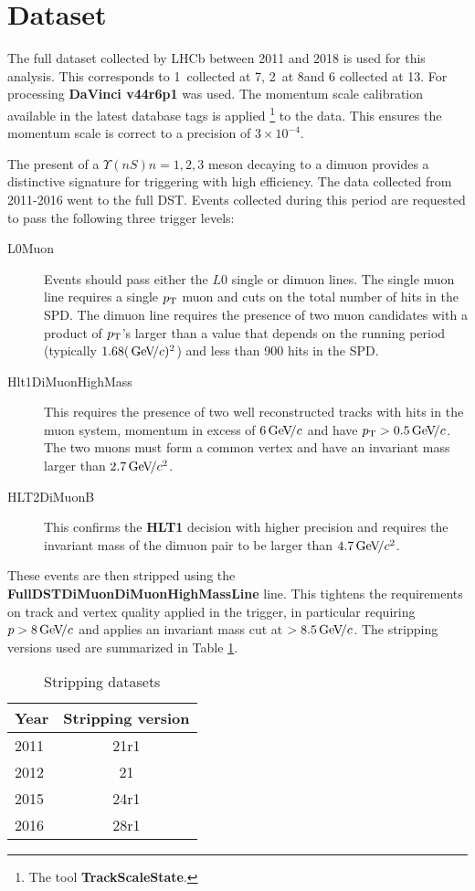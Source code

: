 \section{Dataset}
\label{sec:dataset}
%
The full dataset collected by LHCb between 2011 and 2018 is used for
this analysis. This corresponds to 1~\invfb collected at 7\tev,
2~\invfb at 8\tev and 6 \invfb collected at 13\tev. For processing
\textbf{DaVinci v44r6p1} was used. The momentum scale calibration available in the latest database
tags is applied \footnote{The tool \textbf{TrackScaleState}.} to the data. This
ensures the momentum scale is correct to a precision of $3
\times 10^{-4}$.

The present of a $\Upsilon(nS) n = 1,2,3$ meson decaying to a dimuon
provides a distinctive signature for triggering with high efficiency. The data collected
from 2011-2016 went to the full DST. Events collected during this
period are requested to pass the following three trigger levels:
\begin{description}
\item[L0Muon] Events should pass either the $L0$ single or dimuon
  lines. The single muon line requires a single $p_{\mathrm{T}}$ muon and cuts on
  the total number of hits in the SPD. The dimuon line requires the presence of two muon candidates
  with a product of $p_{\mathrm{T}}$'s larger than a value that depends on the
  running period (typically $1.68 (\text{\,Ge\kern -0.1em V\!/}c)^2$) and less than 900 hits
  in the SPD.
\item[Hlt1DiMuonHighMass] This requires the presence of two well
  reconstructed tracks with hits in the muon system, momentum in
  excess of $6 \text{\,Ge\kern -0.1em V\!/}c$ and have $p_{\mathrm{T}} > 0.5 \text{\,Ge\kern -0.1em V\!/}c$. The two muons must
  form a common vertex and have an invariant mass larger than $2.7
  \text{\,Ge\kern -0.1em V\!/}c^2$. 
\item[HLT2DiMuonB] This confirms the \textbf{HLT1} decision with higher precision and requires
the invariant mass of the dimuon pair to be larger than  $4.7
  \text{\,Ge\kern -0.1em V\!/}c^2$. 
\end{description}
These events are then stripped using the
\textbf{FullDSTDiMuonDiMuonHighMassLine} line. This tightens the
requirements on track and vertex quality applied in the trigger, in
particular requiring $p > 8 \text{\,Ge\kern -0.1em V\!/}c$ and applies an invariant mass cut
at $> 8.5 \text{\,Ge\kern -0.1em V\!/}c$. The stripping versions used are summarized in Table \ref{tab:strip}. 

\begin{table}[htb!]
\caption{\small Stripping datasets }
\begin{center}
\begin{tabular}{l|c}
Year & Stripping version  \\
\hline
2011 & 21r1 \\
2012 & 21 \\
2015 & 24r1 \\
2016 & 28r1 \\
\end{tabular}
\end{center}
\label{tab:strip}
\end{table}

